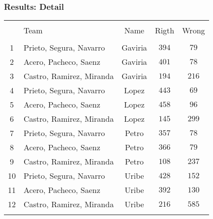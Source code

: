 \documentclass[
  shownotes,
  xcolor={svgnames},
  hyperref={colorlinks,citecolor=DarkBlue,linkcolor=DarkRed,urlcolor=DarkBlue}
  , aspectratio=169]{beamer}
\begin{document}
\begin{frame}
\frametitle{Results: Detail}


\begin{table}[H] \centering 


  \label{} 
\begin{tabular}{@{\extracolsep{5pt}} clccc} 
\\[-1.8ex]\hline 
\hline \\[-1.8ex] 
 & Team &Name & Rigth & Wrong \\ 
\hline \\[-1.8ex] 
1 & Prieto, Segura, Navarro & Gaviria & $394$ & $79$ \\ 
2 & Acero, Pacheco, Saenz & Gaviria & $401$ & $78$ \\ 
3 & Castro, Ramirez, Miranda & Gaviria & $194$ & $216$ \\ 
\hline
4 & Prieto, Segura, Navarro & Lopez & $443$ & $69$ \\ 
5 & Acero, Pacheco, Saenz & Lopez & $458$ & $96$ \\ 
6 & Castro, Ramirez, Miranda & Lopez & $145$ & $299$ \\ 
\hline
7 & Prieto, Segura, Navarro & Petro & $357$ & $78$ \\ 
8 & Acero, Pacheco, Saenz & Petro & $366$ & $79$ \\ 
9 & Castro, Ramirez, Miranda & Petro & $108$ & $237$ \\ 
\hline
10 & Prieto, Segura, Navarro & Uribe & $428$ & $152$ \\ 
11 & Acero, Pacheco, Saenz & Uribe & $392$ & $130$ \\ 
12 & Castro, Ramirez, Miranda & Uribe & $216$ & $585$ \\ 
\hline \\[-1.8ex] 
\end{tabular} 
\end{table} 

\end{frame}
\end{document}
